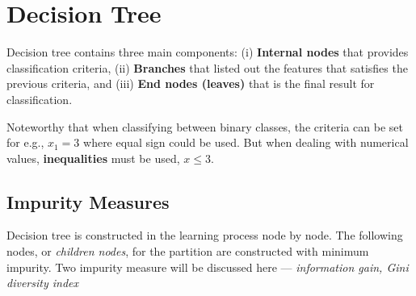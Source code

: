 \documentclass[a4paper,10pt]{article}
\begin{document}
\section{Decision Tree}
Decision tree contains three main components: (i) \textbf{Internal nodes} that provides classification criteria, (ii) \textbf{Branches} that listed out the features that satisfies the previous criteria, and (iii) \textbf{End nodes (leaves)} that is the final result for classification. \par

Noteworthy that when classifying between binary classes, the criteria can be set for e.g., $x_1=3$ where equal sign could be used. But when dealing with numerical values, \textbf{inequalities} must be used, $x\leq3$.

\subsection{Impurity Measures}
Decision tree is constructed in the learning process node by node. The following nodes, or \textit{children nodes}, for the partition are constructed with minimum impurity. Two impurity measure will be discussed here --- \textit{information gain, Gini diversity index}
\end{document}
